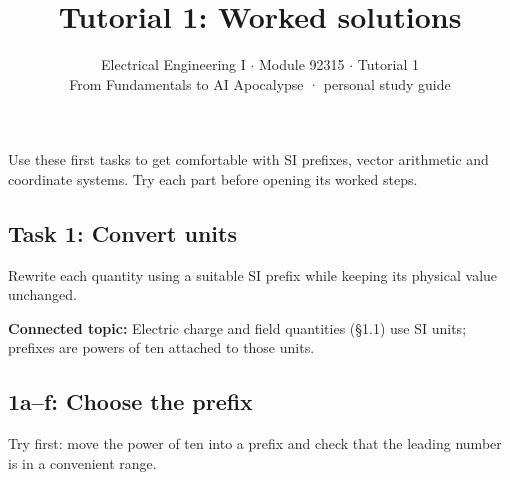 \documentclass[11pt]{article}
\title{\sffamily\bfseries\color{FAUblue}Tutorial 1: Worked solutions}
\author{Electrical Engineering I \ensuremath{\cdot} Module 92315 \ensuremath{\cdot} Tutorial 1\\[2pt]\small From Fundamentals to AI Apocalypse · personal study guide}
\date{}
\begin{document}
\maketitle
\begingroup\footnotesize\setlength{\parskip}{0pt}\tableofcontents\endgroup
\clearpage

{\large Use these first tasks to get comfortable with SI prefixes, vector arithmetic and coordinate systems. Try each part before opening its worked steps.}


\begin{keepsection}
\section{Task 1: Convert units}

Rewrite each quantity using a suitable SI prefix while keeping its physical value unchanged.

\textbf{Connected topic:} Electric charge and field quantities (§1.1) use SI units; prefixes are powers of ten attached to those units.

\begin{keepsection}
\subsection{1a–f: Choose the prefix}

Try first: move the power of ten into a prefix and check that the leading number is in a convenient range.

\end{keepsection}
\end{keepsection}
\end{document}
